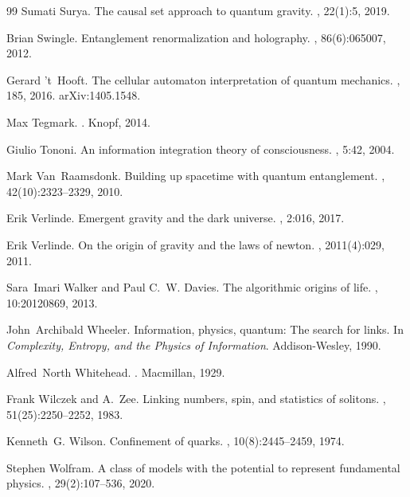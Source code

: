 \begin{thebibliography}{99}
Sumati Surya.
\newblock The causal set approach to quantum gravity.
, 22(1):5, 2019.

Brian Swingle.
\newblock Entanglement renormalization and holography.
, 86(6):065007, 2012.

Gerard 't~Hooft.
\newblock The cellular automaton interpretation of quantum mechanics.
, 185, 2016.
\newblock arXiv:1405.1548.

Max Tegmark.
.
\newblock Knopf, 2014.

Giulio Tononi.
\newblock An information integration theory of consciousness.
, 5:42, 2004.

Mark Van~Raamsdonk.
\newblock Building up spacetime with quantum entanglement.
, 42(10):2323--2329, 2010.

Erik Verlinde.
\newblock Emergent gravity and the dark universe.
, 2:016, 2017.

Erik Verlinde.
\newblock On the origin of gravity and the laws of newton.
, 2011(4):029, 2011.

Sara~Imari Walker and Paul C.~W. Davies.
\newblock The algorithmic origins of life.
, 10:20120869, 2013.

John~Archibald Wheeler.
\newblock Information, physics, quantum: The search for links.
\newblock In {\em Complexity, Entropy, and the Physics of Information}.
  Addison-Wesley, 1990.

Alfred~North Whitehead.
.
\newblock Macmillan, 1929.

Frank Wilczek and A.~Zee.
\newblock Linking numbers, spin, and statistics of solitons.
, 51(25):2250--2252, 1983.

Kenneth~G. Wilson.
\newblock Confinement of quarks.
, 10(8):2445--2459, 1974.

Stephen Wolfram.
\newblock A class of models with the potential to represent fundamental
  physics.
, 29(2):107--536, 2020.

\end{thebibliography}
\endgroup
